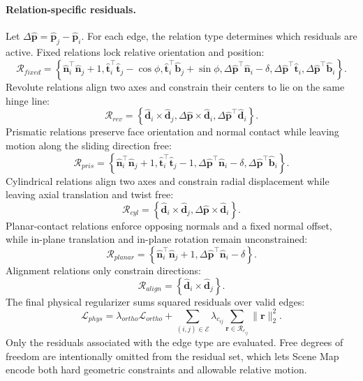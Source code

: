 \paragraph{Relation-specific residuals.}
Let $\Delta\hat{\mathbf{p}}=\hat{\mathbf{p}}_j-\hat{\mathbf{p}}_i$. For each edge, the relation type determines which residuals are active. Fixed relations lock relative orientation and position:
\begin{equation}
\mathcal{R}_{fixed}=
\left\{
\hat{\mathbf{n}}_i^\top\hat{\mathbf{n}}_j+1,
\hat{\mathbf{t}}_i^\top\hat{\mathbf{t}}_j-\cos\phi,
\hat{\mathbf{t}}_i^\top\hat{\mathbf{b}}_j+\sin\phi,
\Delta\hat{\mathbf{p}}^\top\hat{\mathbf{n}}_i-\delta,
\Delta\hat{\mathbf{p}}^\top\hat{\mathbf{t}}_i,
\Delta\hat{\mathbf{p}}^\top\hat{\mathbf{b}}_i
\right\}.
\end{equation}
Revolute relations align two axes and constrain their centers to lie on the same hinge line:
\begin{equation}
\mathcal{R}_{rev}=
\left\{
\hat{\mathbf{d}}_i\times\hat{\mathbf{d}}_j,
\Delta\hat{\mathbf{p}}\times\hat{\mathbf{d}}_i,
\Delta\hat{\mathbf{p}}^\top\hat{\mathbf{d}}_i
\right\}.
\end{equation}
Prismatic relations preserve face orientation and normal contact while leaving motion along the sliding direction free:
\begin{equation}
\mathcal{R}_{pris}=
\left\{
\hat{\mathbf{n}}_i^\top\hat{\mathbf{n}}_j+1,
\hat{\mathbf{t}}_i^\top\hat{\mathbf{t}}_j-1,
\Delta\hat{\mathbf{p}}^\top\hat{\mathbf{n}}_i-\delta,
\Delta\hat{\mathbf{p}}^\top\hat{\mathbf{b}}_i
\right\}.
\end{equation}
Cylindrical relations align two axes and constrain radial displacement while leaving axial translation and twist free:
\begin{equation}
\mathcal{R}_{cyl}=
\left\{
\hat{\mathbf{d}}_i\times\hat{\mathbf{d}}_j,
\Delta\hat{\mathbf{p}}\times\hat{\mathbf{d}}_i
\right\}.
\end{equation}
Planar-contact relations enforce opposing normals and a fixed normal offset, while in-plane translation and in-plane rotation remain unconstrained:
\begin{equation}
\mathcal{R}_{planar}=
\left\{
\hat{\mathbf{n}}_i^\top\hat{\mathbf{n}}_j+1,
\Delta\hat{\mathbf{p}}^\top\hat{\mathbf{n}}_i-\delta
\right\}.
\end{equation}
Alignment relations only constrain directions:
\begin{equation}
\mathcal{R}_{align}=
\left\{
\hat{\mathbf{d}}_i\times\hat{\mathbf{d}}_j
\right\}.
\end{equation}
The final physical regularizer sums squared residuals over valid edges:
\begin{equation}
\mathcal{L}_{phys}
= \lambda_{ortho}\mathcal{L}_{ortho}
+ \sum_{(i,j)\in\mathcal{E}}
\lambda_{c_{ij}}
\sum_{\mathbf{r}\in\mathcal{R}_{c_{ij}}}
\|\mathbf{r}\|_2^2 .
\end{equation}
Only the residuals associated with the edge type are evaluated. Free degrees of freedom are intentionally omitted from the residual set, which lets Scene Map encode both hard geometric constraints and allowable relative motion.

